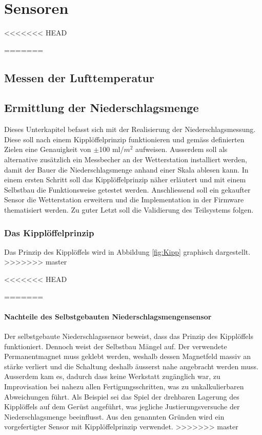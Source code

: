 \section{Sensoren}
<<<<<<< HEAD


=======
\label{chap:Sensoren}
\subsection{Messen der Lufttemperatur}
\subsection{Ermittlung der Niederschlagsmenge}
Dieses Unterkapitel befasst sich mit der Realisierung der Niederschlagsmessung. Diese soll nach einem Kipplöffelprinzip funktionieren und gemäss definierten Zielen eine Genauigkeit von $\pm$100 ml/$m^2$ aufweisen. Ausserdem soll als alternative zusätzlich ein Messbecher an der Wetterstation installiert werden, damit der Bauer die Niederschlagsmenge anhand einer Skala ablesen kann. In einem ersten Schritt soll das Kipplöffelprinzip näher erläutert und mit einem Selbstbau die Funktionsweise getestet werden. Anschliessend soll ein gekaufter Sensor die Wetterstation erweitern und die Implementation in der Firmware thematisiert werden. Zu guter Letzt soll die Validierung des Teilsystems folgen.
\subsubsection*{Das Kipplöffelprinzip}
Das Prinzip des Kipplöffels wird in Abbildung \ref{fig:Kipp} graphisch dargestellt.
>>>>>>> master

\newpage


\newpage



%

\newpage

<<<<<<< HEAD

=======
\paragraph{Nachteile des Selbstgebauten Niederschlagsmengensensor}
Der selbstgebaute Niederschlagssensor beweist, dass das Prinzip des Kipplöffels funktioniert. Dennoch weist der Selbstbau Mängel auf. Der verwendete Permanentmagnet muss geklebt werden, weshalb dessen Magnetfeld massiv an stärke verliert und die Schaltung deshalb äusserst nahe angebracht werden muss. Ausserdem kam es, dadurch dass keine Werkstatt zugänglich war, zu Improvisation bei nahezu allen Fertigungsschritten, was zu unkalkulierbaren Abweichungen führt. Als Beispiel sei das Spiel der drehbaren Lagerung des Kipplöffels auf dem Gerüst angeführt, was jegliche Justierungsversuche der Niederschlagsmenge beeinflusst. Aus den genannten Gründen wird ein vorgefertigter Sensor mit Kipplöffelprinzip verwendet.
>>>>>>> master


